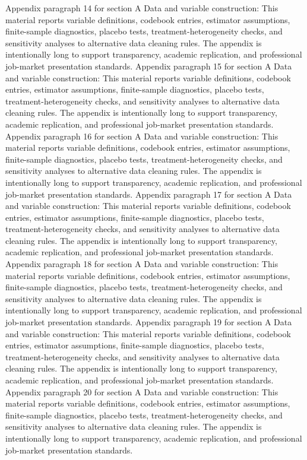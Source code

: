 \documentclass[preprint,12pt]{elsarticle}
\begin{document}
Appendix paragraph 14 for section A Data and variable construction: This material reports variable definitions, codebook entries, estimator assumptions, finite-sample diagnostics, placebo tests, treatment-heterogeneity checks, and sensitivity analyses to alternative data cleaning rules. The appendix is intentionally long to support transparency, academic replication, and professional job-market presentation standards.
Appendix paragraph 15 for section A Data and variable construction: This material reports variable definitions, codebook entries, estimator assumptions, finite-sample diagnostics, placebo tests, treatment-heterogeneity checks, and sensitivity analyses to alternative data cleaning rules. The appendix is intentionally long to support transparency, academic replication, and professional job-market presentation standards.
Appendix paragraph 16 for section A Data and variable construction: This material reports variable definitions, codebook entries, estimator assumptions, finite-sample diagnostics, placebo tests, treatment-heterogeneity checks, and sensitivity analyses to alternative data cleaning rules. The appendix is intentionally long to support transparency, academic replication, and professional job-market presentation standards.
Appendix paragraph 17 for section A Data and variable construction: This material reports variable definitions, codebook entries, estimator assumptions, finite-sample diagnostics, placebo tests, treatment-heterogeneity checks, and sensitivity analyses to alternative data cleaning rules. The appendix is intentionally long to support transparency, academic replication, and professional job-market presentation standards.
Appendix paragraph 18 for section A Data and variable construction: This material reports variable definitions, codebook entries, estimator assumptions, finite-sample diagnostics, placebo tests, treatment-heterogeneity checks, and sensitivity analyses to alternative data cleaning rules. The appendix is intentionally long to support transparency, academic replication, and professional job-market presentation standards.
Appendix paragraph 19 for section A Data and variable construction: This material reports variable definitions, codebook entries, estimator assumptions, finite-sample diagnostics, placebo tests, treatment-heterogeneity checks, and sensitivity analyses to alternative data cleaning rules. The appendix is intentionally long to support transparency, academic replication, and professional job-market presentation standards.
Appendix paragraph 20 for section A Data and variable construction: This material reports variable definitions, codebook entries, estimator assumptions, finite-sample diagnostics, placebo tests, treatment-heterogeneity checks, and sensitivity analyses to alternative data cleaning rules. The appendix is intentionally long to support transparency, academic replication, and professional job-market presentation standards.
\end{document}
